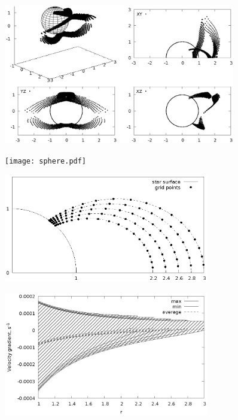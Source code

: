 \documentclass{article}
\begin{document}
\begin{figure}[h]
\centering
\includegraphics[width=0.9\textwidth]{surf.eps}
\caption{\rm}
\label{fig:CPsurf}
\end{figure}

\begin{figure}
\centering
\texttt{[image: sphere.pdf]}
\caption{\rm}
\label{fig:CPmap}
\end{figure}

\begin{figure}[!h]
\centering
\includegraphics[width=0.8\textwidth]{grid.eps}
\caption{\rm}
\label{fig:grid}
\end{figure}

\begin{figure}[!h]
\centering
\includegraphics[width=0.8\textwidth]{grad.eps}
\caption{\rm}
\label{fig:grad}
\end{figure}
\end{document}
